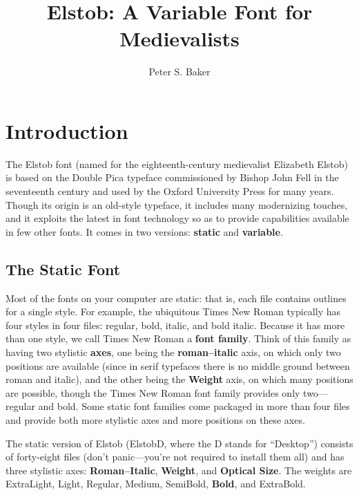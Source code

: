 \documentclass[12pt,letterpaper,openany]{book}
\title{Elstob: A Variable Font for Medievalists}
\author{Peter S. Baker}
\begin{document}
\maketitle

\chapter{Introduction}

\pagestyle{fancy}

The Elstob font (named for the eighteenth-century medievalist Elizabeth Elstob)
is based on the Double Pica typeface commissioned by Bishop John Fell in the
seventeenth century and used by the Oxford University Press for many years.
Though its origin is an old-style typeface, it includes many modernizing touches,
and it exploits the latest in font technology so as to provide capabilities
available in few other fonts. It comes in two versions: \textbf{static} and
\textbf{variable}.

\section{The Static Font}

Most of the fonts on your
computer are static: that is, each file contains outlines for a single style.
For example, the ubiquitous Times New Roman typically has four styles in four
files: regular, bold, italic, and bold italic. Because it has more than one
style, we call Times New Roman a \textbf{font family}. Think of this family as
having two stylistic \textbf{axes}, one being the \textbf{roman--italic} axis, on which
only two positions are available (since in serif typefaces there is no middle
ground between roman and italic), and
the other being the \textbf{Weight} axis, on which many positions are possible,
though the Times New Roman font family provides only two---regular and bold.
Some static font families come packaged in more than four files and provide both more
stylistic axes and more positions on these axes.

The static version of Elstob (ElstobD, where the D stands for “Desktop”) consists
of forty-eight files (don't panic---you're not required to install them all) and
has three stylistic
axes: \textbf{Roman--Italic}, \textbf{Weight}, and \textbf{Optical Size}. The
weights are {\extralight ExtraLight}, {\light Light}, Regular, {\medium Medium},
{\semibold SemiBold}, \textbf{Bold}, and {\extrabold ExtraBold}.
\end{document}
